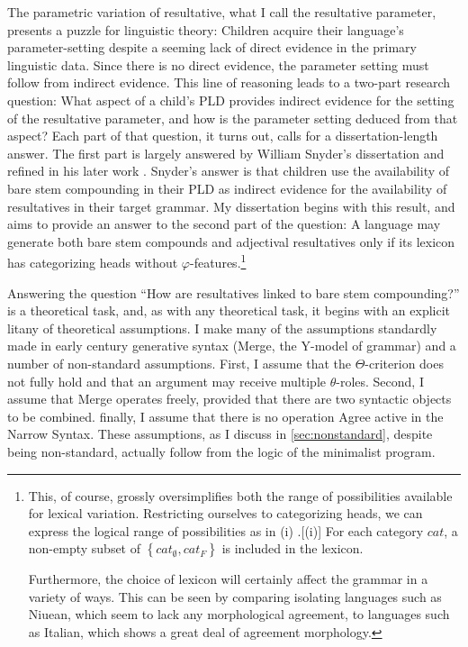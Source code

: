 The parametric variation of resultative, what I call the resultative parameter, presents a puzzle for linguistic theory:
Children acquire their language's parameter-setting despite a seeming lack of direct evidence in the primary linguistic data.
Since there is no direct evidence, the parameter setting must follow from indirect evidence.
This line of reasoning leads to a two-part research question:
What aspect of a child's PLD provides indirect evidence for the setting of the resultative parameter, and how is the parameter setting deduced from that aspect?
Each part of that question, it turns out, calls for a dissertation-length answer.
The first part is largely answered by William Snyder's dissertation \parencite{snyder1995language} and refined in his later work \parencite{snyder2001nature,snyder2012parameter,snyder2016compound}.
Snyder's answer is that children use the availability of bare stem compounding in their PLD as indirect evidence for the availability of resultatives in their target grammar.
My dissertation begins with this result, and aims to provide an answer to the second part of the question: 
A language may generate both bare stem compounds and adjectival resultatives only if its lexicon has categorizing heads without $\varphi$-features.\footnote{
	This, of course, grossly oversimplifies both the range of possibilities available for lexical variation.
	Restricting ourselves to categorizing heads, we can express the logical range of possibilities as in (i)
	\ex.[(i)] For each category $cat$, a non-empty subset of $\left\{ cat_{\emptyset}, cat_{F} \right\}$ is included in the lexicon.

	Furthermore, the choice of lexicon will certainly affect the grammar in a variety of ways.
	This can be seen by comparing isolating languages such as Niuean, which seem to lack any morphological agreement, to languages such as Italian, which shows a great deal of agreement morphology.
}

Answering the question ``How are resultatives linked to bare stem compounding?'' is a theoretical task, and, as with any theoretical task, it begins with an explicit litany of theoretical assumptions.
I make many of the assumptions standardly made in early  century generative syntax (Merge, the Y-model of grammar) and a number of non-standard assumptions.
First, I assume that the $\Theta$-criterion does not fully hold and that an argument may receive multiple $\theta$-roles.
Second, I assume that Merge operates freely, provided that there are two syntactic objects to be combined.
finally, I assume that there is no operation Agree active in the Narrow Syntax.
These assumptions, as I discuss in \cref{sec:nonstandard}, despite being non-standard, actually follow from the logic of the minimalist program.

